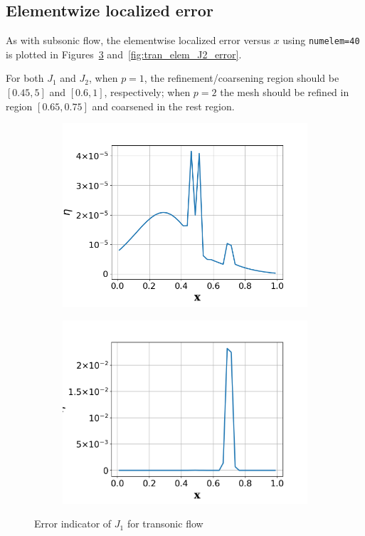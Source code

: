 \documentclass[a4paper]{article}
\begin{document}
\subsection{Elementwize localized error}
As with subsonic flow, the elementwise localized error versus $x$ using \texttt{numelem=40} is plotted in Figures~\ref{fig:tran_elem_J1_error} and~\ref{fig:tran_elem_J2_error}. 

For both $J_1$ and $J_2$, when $p=1$, the refinement/coarsening region should be $[0.45, 5]$ and $[0.6, 1]$, respectively; when $p=2$ the mesh should be refined in region $[0.65, 0.75]$ and coarsened in the rest region.
\begin{figure}[!htbp]
  \centering
  \centering
  \begin{subfigure}{0.45\textwidth}
    \centering
    \includegraphics[width=1.0\linewidth]{figures/transonic_elem_J1error_indicator_p1.png}
    \label{fig:transonic_J1_eta_p1}
  \end{subfigure}
  \begin{subfigure}{0.45\textwidth}
    \centering
    \includegraphics[width=1.0\linewidth]{figures/transonic_elem_J1error_indicator_p2.png}
    \label{fig:transonic_J1_eta_p2}
  \end{subfigure}
  \caption{Error indicator of $J_1$ for transonic flow}
  \label{fig:tran_elem_J1_error}
\end{figure}
\end{document}
